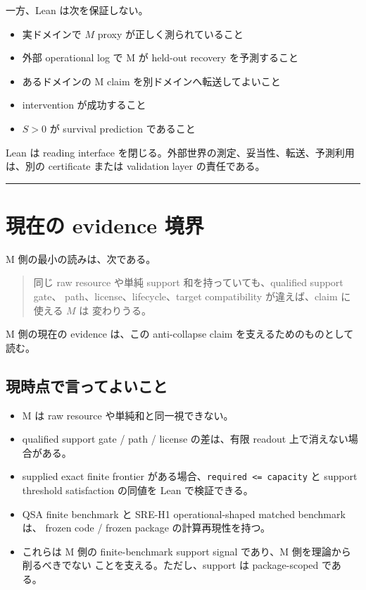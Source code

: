 \documentclass[12pt,a4paper]{article}
\begin{document}
一方、Lean は次を保証しない。

\begin{itemize}
\tightlist
\item
  実ドメインで \(M\) proxy が正しく測られていること
\item
  外部 operational log で M が held-out recovery を予測すること
\item
  あるドメインの M claim を別ドメインへ転送してよいこと
\item
  intervention が成功すること
\item
  \(S>0\) が survival prediction であること
\end{itemize}

Lean は reading interface を閉じる。外部世界の測定、妥当性、転送、予測利用は、別の certificate または validation layer の責任である。

\begin{center}\rule{0.5\linewidth}{0.5pt}\end{center}

\section{現在の evidence 境界}\label{ux73feux5728ux306e-evidence-ux5883ux754c}

M 側の最小の読みは、次である。

\begin{quote}
同じ raw resource や単純 support 和を持っていても、qualified support gate、 path、license、lifecycle、target compatibility が違えば、claim に使える \(M\) は 変わりうる。
\end{quote}

M 側の現在の evidence は、この anti-collapse claim を支えるためのものとして読む。

\subsection{現時点で言ってよいこと}\label{ux73feux6642ux70b9ux3067ux8a00ux3063ux3066ux3088ux3044ux3053ux3068}

\begin{itemize}
\tightlist
\item
  M は raw resource や単純和と同一視できない。
\item
  qualified support gate / path / license の差は、有限 readout 上で消えない場合がある。
\item
  supplied exact finite frontier がある場合、\texttt{required\ \textless{}=\ capacity} と support threshold satisfaction の同値を Lean で検証できる。
\item
  QSA finite benchmark と SRE-H1 operational-shaped matched benchmark は、 frozen code / frozen package の計算再現性を持つ。
\item
  これらは M 側の finite-benchmark support signal であり、M 側を理論から削るべきでない ことを支える。ただし、support は package-scoped である。
\end{itemize}
\end{document}
